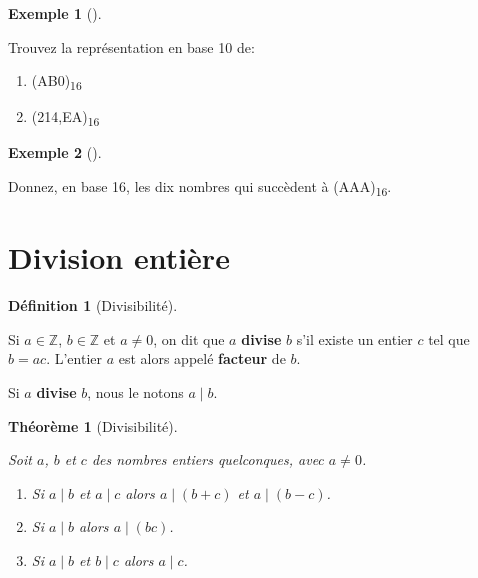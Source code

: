 \documentclass[
  letterpaper,
]{scrbook}
\providecommand{\tightlist}{%
  \setlength{\itemsep}{0pt}\setlength{\parskip}{0pt}}\usepackage{longtable,booktabs,array}
\theoremstyle{plain}
\newtheorem{theorem}{Théorème}[chapter]
\theoremstyle{definition}
\newtheorem{example}{Exemple}[chapter]
\theoremstyle{definition}
\newtheorem{definition}{Définition}[chapter]
\theoremstyle{remark}
\begin{document}
\leavevmode{}%
\begin{example}[]\label{exm-conversion-hexa-decimal}

Trouvez la représentation en base 10 de:

\begin{enumerate}
\def\labelenumi{\alph{enumi})}
\tightlist
\item
  (AB0)\textsubscript{16}
\item
  (214,EA)\textsubscript{16}
\end{enumerate}

\end{example}

\leavevmode{}%
\begin{example}[]\label{exm-nombres-succedent-hexa}

Donnez, en base 16, les dix nombres qui succèdent à
(AAA)\textsubscript{16}.

\end{example}

\hypertarget{division-entiuxe8re}{%
\section{Division entière}\label{division-entiuxe8re}}

\leavevmode{}%
\begin{definition}[Divisibilité]\label{def-divisibilite}

Si \(a\in\mathbb{Z}\), \(b\in\mathbb{Z}\) et \(a\neq 0\), on dit que
\(a\) \textbf{divise} \(b\) s'il existe un entier \(c\) tel que
\(b=ac\). L'entier \(a\) est alors appelé \textbf{facteur} de \(b\).

Si \(a\) \textbf{divise} \(b\), nous le notons \(a \mid b\).

\end{definition}

\leavevmode{}%
\begin{theorem}[Divisibilité]\label{thm-divisibilite}

Soit \(a\), \(b\) et \(c\) des nombres entiers quelconques, avec
\(a\neq 0\).

\begin{enumerate}
\def\labelenumi{\arabic{enumi}.}
\tightlist
\item
  Si \(a\mid b\) et \(a\mid c\) alors \(a\mid(b+c)\) et \(a\mid (b-c)\).
\item
  Si \(a\mid b\) alors \(a\mid (bc)\).
\item
  Si \(a\mid b\) et \(b\mid c\) alors \(a\mid c\).
\end{enumerate}

\end{theorem}
\end{document}
